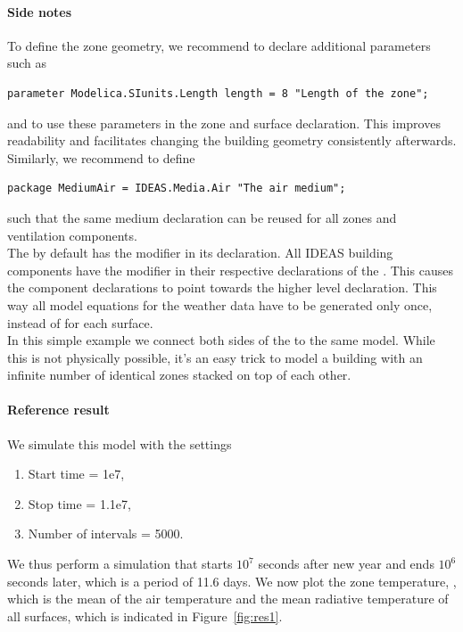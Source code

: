 \documentclass[10pt,a4paper]{article}
\begin{document}
\paragraph{Side notes}
To define the zone geometry, 
we recommend to declare additional parameters such as
\begin{verbatim}
parameter Modelica.SIunits.Length length = 8 "Length of the zone";
\end{verbatim}
and to use these parameters in the zone and surface declaration. 
This improves readability and facilitates changing the building geometry consistently afterwards.\\

Similarly, we recommend to define
\begin{verbatim}
package MediumAir = IDEAS.Media.Air "The air medium";
\end{verbatim}
such that the same medium declaration can be reused for all zones and ventilation components.\\

The  by default has the modifier  in its declaration. 
All IDEAS building components have the modifier  in their respective 
declarations of the . 
This causes the component declarations to point towards the higher level 
declaration. This way all model equations for the weather data have to be generated only once,
instead of for each surface.\\

In this simple example we connect both sides of the  to the same model.
While this is not physically possible, it's an easy trick to model a building with an 
infinite number of identical zones stacked on top of each other.

\paragraph{Reference result}
We simulate this model with the settings
\begin{enumerate}
\item Start time = 1e7,
\item Stop time = 1.1e7,
\item Number of intervals = 5000.
\end{enumerate}
We thus perform a simulation that starts $10^7$ seconds after new year and ends $10^6$
seconds later, which is a period of 11.6 days.
We now plot the zone temperature, ,
which is the mean of the air temperature and the mean radiative 
temperature of all surfaces, which is indicated in Figure~\ref{fig:res1}.
\end{document}
